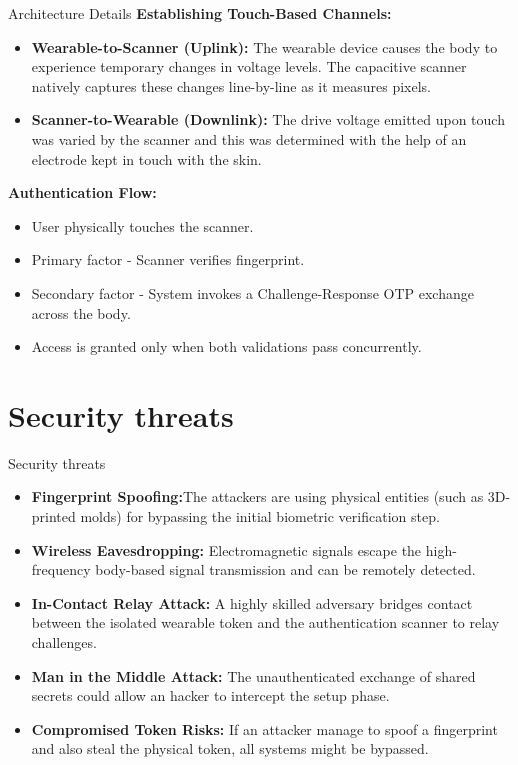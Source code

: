 \documentclass[aspectratio=169,t,xcolor=table]{beamer}
\begin{document}
\begin{frame}{Architecture Details}
    \textbf{Establishing Touch-Based Channels:}
    \begin{itemize}
        \item \textbf{Wearable-to-Scanner (Uplink):} The wearable device causes the body to experience temporary changes in voltage levels. The capacitive scanner natively captures these changes line-by-line as it measures pixels.
        \item \textbf{Scanner-to-Wearable (Downlink):} The drive voltage emitted upon touch was varied by the scanner and this was determined with the help of an electrode kept in touch with the skin.
    \end{itemize}
    \vspace{0.5em}
    \textbf{Authentication Flow:}
    \begin{itemize}
        \item User physically touches the scanner.
        \item Primary factor - Scanner verifies fingerprint.
        \item Secondary factor - System invokes a Challenge-Response OTP exchange across the body.
        \item Access is granted only when both validations pass concurrently.
    \end{itemize}
\end{frame}

\section{Security threats}
\begin{frame}{Security threats}
    \begin{itemize}
        \item \textbf{Fingerprint Spoofing:}The attackers are using physical entities (such as 3D-printed molds) for bypassing the initial biometric verification step.
        \item \textbf{Wireless Eavesdropping:} Electromagnetic signals escape the high-frequency body-based signal transmission and can be remotely detected.
        \item \textbf{In-Contact Relay Attack:} A highly skilled adversary bridges contact between the isolated wearable token and the authentication scanner to relay challenges.
        \item \textbf{Man in the Middle Attack:} The unauthenticated exchange of shared secrets could allow an hacker to intercept the setup phase.
        \item \textbf{Compromised Token Risks:} If an attacker manage to spoof a fingerprint and also steal the physical token, all systems might be bypassed.
    \end{itemize}
\end{frame}
\end{document}
